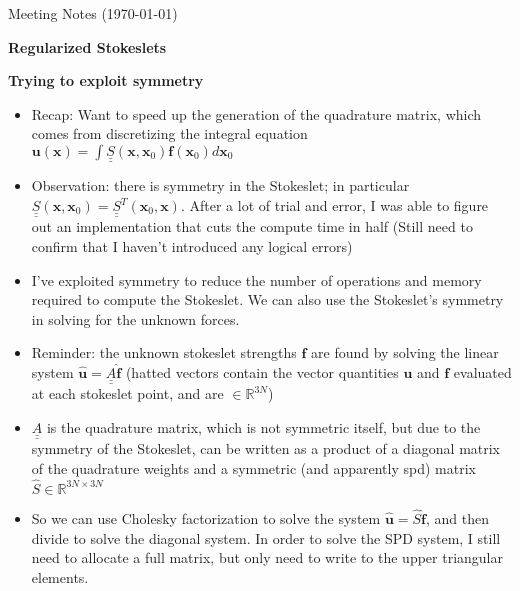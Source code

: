 \documentclass{article}
\def\R{\mathbb{R}}
\begin{document}
\pagestyle{plain}

\begin{center}
  {\Large Meeting Notes (\today)}
\end{center}

\large{\textbf{Regularized Stokeslets}}

\textbf{Trying to exploit symmetry}
\begin{itemize}
\item Recap: Want to speed up the generation of the quadrature matrix,
  which comes from discretizing the integral equation
  $\mathbf{u}(\mathbf{x}) = \int \underline{\underline{S}}(\mathbf{x},
  \mathbf{x}_0) \mathbf{f}(\mathbf{x}_0) d\mathbf{x}_0$
\item Observation: there is symmetry in the Stokeslet; in
  particular $\underline{\underline{S}}(\mathbf{x}, \mathbf{x}_0) =
  \underline{\underline{S}}^T(\mathbf{x}_0, \mathbf{x})$. After a lot
  of trial and error, I was able to figure out an implementation that
  cuts the compute time in half (Still need to confirm that I haven't
  introduced any logical errors)
\item I've exploited symmetry to reduce the number of operations and
  memory required to compute the Stokeslet. We can also use the
  Stokeslet's symmetry in solving for the unknown forces.
\item Reminder: the unknown stokeslet strengths $\mathbf{f}$ are found
  by solving the linear system $\hat{\mathbf{u}} =
  \underline{\underline{A}} \hat{\mathbf{f}}$ (hatted vectors contain
  the vector quantities $\mathbf{u}$ and $\mathbf{f}$ evaluated at
  each stokeslet point, and are $\in \R^{3N}$)
\item $\underline{\underline{A}}$ is the quadrature matrix, which is
  not symmetric itself, but due to the symmetry of the Stokeslet, can
  be written as a product of a diagonal matrix of the quadrature
  weights and a symmetric (and apparently spd) matrix
  $\hat{S} \in \R^{3N \times 3N}$
\item So we can use Cholesky factorization to solve the system
  $\hat{\mathbf{u}} = \hat{S} \hat{\mathbf{f}}$, and then divide to
  solve the diagonal system. In order to solve the SPD system, I still
  need to allocate a full matrix, but only need to write to the upper
  triangular elements.
\end{itemize}
\end{document}
